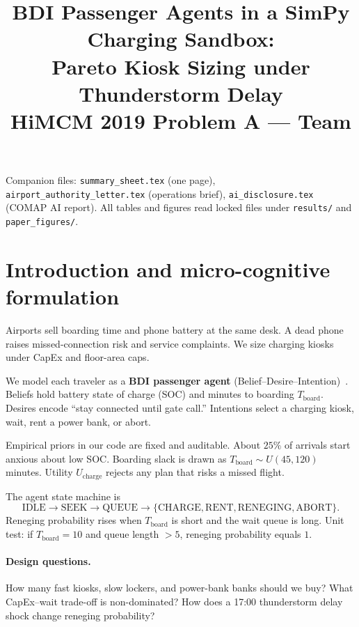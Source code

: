 \documentclass[11pt]{article}
\title{\textbf{BDI Passenger Agents in a SimPy Charging Sandbox:\\
Pareto Kiosk Sizing under Thunderstorm Delay}\\[0.35em]
\large HiMCM 2019 Problem A --- Team \TeamNumber}
\author{}
\date{}
\begin{document}
\maketitle
\thispagestyle{empty}

\noindent
Companion files: \texttt{summary\_sheet.tex} (one page),
\texttt{airport\_authority\_letter.tex} (operations brief),
\texttt{ai\_disclosure.tex} (COMAP AI report).
All tables and figures read locked files under \texttt{results/}
and \texttt{paper\_figures/}.

\tableofcontents
\newpage

\section{Introduction and micro-cognitive formulation}

Airports sell boarding time and phone battery at the same desk.
A dead phone raises missed-connection risk and service complaints.
We size charging kiosks under CapEx and floor-area caps.

We model each traveler as a \textbf{BDI passenger agent}
(Belief--Desire--Intention)~\cite{bdi2026}.
Beliefs hold battery state of charge (SOC) and minutes to boarding
$T_{\mathrm{board}}$.
Desires encode ``stay connected until gate call.''
Intentions select a charging kiosk, wait, rent a power bank, or abort.

Empirical priors in our code are fixed and auditable.
About $25\%$ of arrivals start anxious about low SOC.
Boarding slack is drawn as $T_{\mathrm{board}}\sim U(45,120)$ minutes.
Utility $U_{\mathrm{charge}}$ rejects any plan that risks a missed flight.

The agent state machine is
\[
\mathrm{IDLE}\to\mathrm{SEEK}\to\mathrm{QUEUE}
\to\{\mathrm{CHARGE},\mathrm{RENT},\mathrm{RENEGING},\mathrm{ABORT}\}.
\]
Reneging probability rises when $T_{\mathrm{board}}$ is short and the
wait queue is long.
Unit test: if $T_{\mathrm{board}}=10$ and queue length $>5$,
reneging probability equals $1$.

\paragraph{Design questions.}
How many fast kiosks, slow lockers, and power-bank banks should we buy?
What CapEx--wait trade-off is non-dominated?
How does a 17:00 thunderstorm delay shock change reneging probability?
\end{document}
